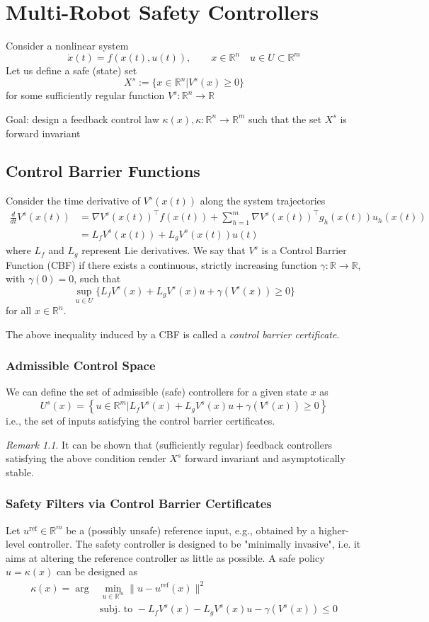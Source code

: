 \documentclass{book}
\newcommand{\R}{\mathbb{R}}
\theoremstyle{theoremv2}
\theoremstyle{defv2}
\theoremstyle{remark}
\newtheorem*{remark}{Remark}
\theoremstyle{remark}
\theoremstyle{definition}
\theoremstyle{definition}
\begin{document}
\chapter{Multi-Robot Safety Controllers}
Consider a nonlinear system 
\[
    \dot{x}(t) = f(x(t),u(t)), \qquad x\in\R^n \quad u\in U\subset \R^m
\]
Let us define a safe (state) set 
\[
    X^s := \{ x\in\R^n | V^s(x)\geq0 \}
\]
for some sufficiently regular function $V^s:\R^n\to\R$

Goal: design a feedback control law $\kappa(x),\kappa:\R^n\to\R^m$ such that the set $X^s$ is forward invariant

\section{Control Barrier Functions}
Consider the time derivative of $V^s(x(t))$ along the system trajectories
\begin{align*}
    \displaystyle\frac{d}{dt}V^s(x(t)) &= \nabla V^s(x(t))^\top f(x(t)) + \displaystyle\sum_{h=1}^{m}\nabla V^s(x(t))^\top g_h(x(t))u_h(x(t))\\
                                       &= L_fV^s(x(t)) + L_gV^s(x(t))u(t)
\end{align*}
where $L_f$ and $L_g$ represent Lie derivatives.
We say that $V^s$ is a Control Barrier Function (CBF) if there exists a continuous, strictly increasing function $\gamma:\R\to\R$, with $\gamma(0)=0$, such that 
\[
    \sup_{u\in U}\{ L_fV^s(x) + L_gV^s(x)u + \gamma(V^s(x))\geq 0 \}
\]
for all $x\in\R^n$.

The above inequality induced by a CBF is called a \emph{control barrier certificate}.
\subsection{Admissible Control Space}
We can define the set of admissible (safe) controllers for a given state $x$ as 
\[
    U^s(x) = \left\{ u\in\R^m | L_fV^s(x) + L_gV^s(x)u + \gamma(V^s(x))\geq 0 \right\}
\]
i.e., the set of inputs satisfying the control barrier certificates. 
\begin{remark}
    It can be shown that (sufficiently regular) feedback controllers satisfying the above condition render $X^s$ forward invariant and asymptotically stable.
\end{remark}

\subsection{Safety Filters via Control Barrier Certificates}
Let $u^\text{ref}\in\R^m$ be a (possibly unsafe) reference input, e.g., obtained by a higher-level controller. The safety controller is designed to be "minimally invasive", i.e. it aims at altering the reference controller as little as possible. A safe policy $u = \kappa(x)$ can be designed as 
\begin{align*}
    \kappa(x) = \arg &\min_{u\in\R^m} \|u-u^\text{ref}(x)\|^2\\
                     &\text{subj. to } -L_fV^s(x) - L_gV^s(x)u - \gamma(V^s(x))\leq 0
\end{align*}
\end{document}
